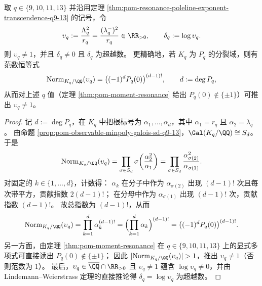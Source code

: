 \begin{theorem}\label{thm:pom-resonance-newman-log-transcendence-norm-q9-13}
取 \(q\in\{9,10,11,13\}\) 并沿用定理 \ref{thm:pom-resonance-poleline-exponent-transcendence-q9-13} 的记号，令
\[
\upsilon_q:=\frac{\Lambda_q^{2}}{r_q}=\frac{(\lambda_q^-)^2}{r_q}\in\RR_{>0},
\qquad
\delta_q:=\log\upsilon_q.
\]
则 \(\upsilon_q\neq 1\)，并且 \(\delta_q\neq 0\) 且 \(\delta_q\) 为超越数。
更精确地，若 \(K_q\) 为 \(P_q\) 的分裂域，则有范数恒等式
\[
\mathrm{Norm}_{K_q/\QQ}(\upsilon_q)=\bigl((-1)^{d}P_q(0)\bigr)^{(d-1)!},
\qquad d:=\deg P_q,
\]
从而对上述 \(q\) 值（定理 \ref{thm:pom-moment-resonance} 给出 \(P_q(0)\notin\{\pm 1\}\)）可推出 \(\upsilon_q\neq 1\)。
\end{theorem}
\begin{proof}
记 \(d:=\deg P_q\)，在 \(K_q\) 中把根标号为 \(\alpha_1,\dots,\alpha_d\)，其中 \(\alpha_1=r_q\) 且 \(\alpha_2=\lambda_q^-\)。
由命题 \ref{prop:pom-observable-minpoly-galois-sd-q9-13}，\(\Gal(K_q/\QQ)\cong S_d\)。
于是
\[
\mathrm{Norm}_{K_q/\QQ}(\upsilon_q)
=\prod_{\sigma\in S_d}\sigma\!\left(\frac{\alpha_2^2}{\alpha_1}\right)
=\prod_{\sigma\in S_d}\frac{\alpha_{\sigma(2)}^2}{\alpha_{\sigma(1)}}.
\]
对固定的 \(k\in\{1,\dots,d\}\)，计数得：
\(\alpha_k\) 在分子中作为 \(\alpha_{\sigma(2)}\) 出现 \((d-1)!\) 次且每次带平方，贡献指数 \(2(d-1)!\)；
在分母中作为 \(\alpha_{\sigma(1)}\) 出现 \((d-1)!\) 次，贡献指数 \((d-1)!\)。
故总指数为 \((d-1)!\)，从而
\[
\mathrm{Norm}_{K_q/\QQ}(\upsilon_q)
=\prod_{k=1}^{d}\alpha_k^{(d-1)!}
=\Bigl(\prod_{k=1}^{d}\alpha_k\Bigr)^{(d-1)!}
=\bigl((-1)^{d}P_q(0)\bigr)^{(d-1)!}.
\]
另一方面，由定理 \ref{thm:pom-moment-resonance} 在 \(q\in\{9,10,11,13\}\) 上的显式多项式可直接读出 \(P_q(0)\notin\{\pm 1\}\)；
因此 \(|\mathrm{Norm}_{K_q/\QQ}(\upsilon_q)|>1\)，推出 \(\upsilon_q\neq 1\)（否则范数为 \(1\)）。
最后，\(\upsilon_q\in\overline{\QQ}\cap\RR_{>0}\) 且 \(\upsilon_q\neq 1\) 蕴含 \(\log\upsilon_q\neq 0\)，并由 Lindemann--Weierstrass 定理的直接推论得 \(\delta_q=\log\upsilon_q\) 为超越数。
\end{proof}

